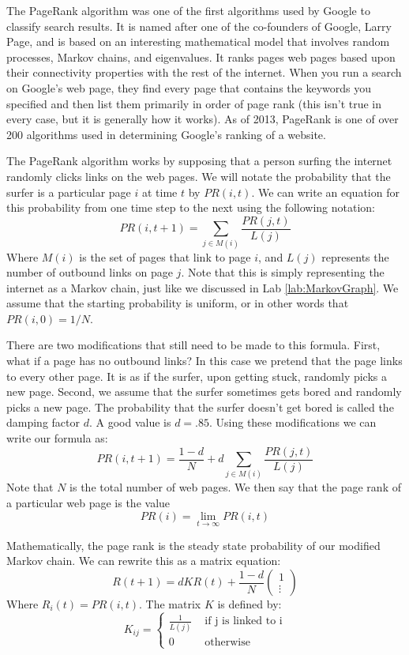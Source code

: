 \label{lab:PageRank}

The PageRank algorithm was one of the first algorithms used by Google to classify search results.
It is named after one of the co-founders of Google, Larry Page, and is based on an interesting mathematical model that involves random processes, Markov chains, and eigenvalues.
It ranks pages web pages based upon their connectivity properties with the rest of the internet.
When you run a search on Google's web page, they find every page that contains the keywords you specified and then list them primarily in order of page rank (this isn't true in every case, but it is generally how it works).
As of 2013, PageRank is one of over 200 algorithms used in determining Google's ranking of a website.

The PageRank algorithm works by supposing that a person surfing the internet randomly clicks links on the web pages.
We will notate the probability that the surfer is a particular page $i$ at time $t$ by $PR(i,t)$.
We can write an equation for this probability from one time step to the next using the following notation:
\[PR(i,t+1) = \sum_{j \in M(i)} \frac{PR(j,t)}{L(j)}\]
Where $M(i)$ is the set of pages that link to page $i$, and $L(j)$ represents the number of outbound links on page $j$.
Note that this is simply representing the internet as a Markov chain, just like we discussed in Lab \ref{lab:MarkovGraph}.
We assume that the starting probability is uniform, or in other words that $PR(i,0) = 1/N$.

There are two modifications that still need to be made to this formula.
First, what if a page has no outbound links?
In this case we pretend that the page links to every other page.
It is as if the surfer, upon getting stuck, randomly picks a new page.
Second, we assume that the surfer sometimes gets bored and randomly picks a new page.
The probability that the surfer doesn't get bored is called the damping factor $d$.
A good value is $d=.85$.
Using these modifications we can write our formula as:
\[PR(i,t+1) = \frac{1-d}{N} + d\sum_{j \in M(i)} \frac{PR(j,t)}{L(j)}\]
Note that $N$ is the total number of web pages.
We then say that the page rank of a particular web page is the value
\[PR(i) = \lim_{t\to \infty} PR(i,t)\]

Mathematically, the page rank is the steady state probability of our modified Markov chain.
We can rewrite this as a matrix equation:
\[R(t+1) = d K R(t) + \frac{1-d}{N} \begin{pmatrix}1\\\vdots\end{pmatrix}\]
Where $R_i(t) = PR(i,t)$.
The matrix $K$ is defined by:
\[K_{ij} = \begin{cases} \frac{1}{L(j)} & \mbox{ if j is linked to i} \\
	0 & \mbox{ otherwise} \end{cases}\]

